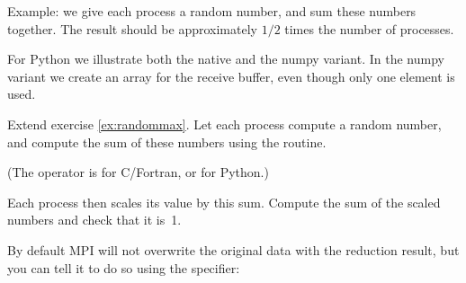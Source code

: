 
Example: we give each process a random number, and sum these numbers together.
The result should be approximately $1/2$ times the number of processes.


For Python we illustrate both the native and the numpy variant. In the
numpy variant we create an array for the receive buffer, even though
only one element is used.


\begin{exercise}
  \label{ex:randommaxscale}
  Extend  exercise \ref{ex:randommax}.
  Let each process compute a random number,
  and compute the sum of these numbers using the 
  routine.

  (The operator is  for C/Fortran, or  for
  Python.)
  
  Each process then scales its value
  by this sum. Compute the sum of the scaled numbers and check that it is~1.
\end{exercise}

By default MPI will not overwrite the original data with the reduction
result, but you can tell it to do so
using the  specifier:



